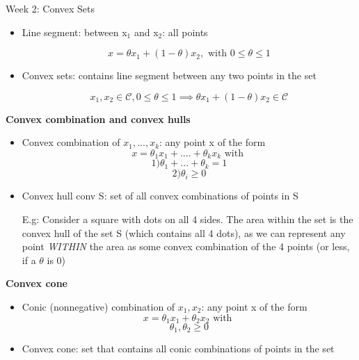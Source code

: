 \documentclass{article}
\begin{document}
\begin{homeworkProblemName}{{\LARGE Week 2: Convex Sets}}
\begin{problemAnswer}
{      \begin{itemize}
      \item  Line segment: between x$_1$ and x$_2$: all points

        \[x = \theta x_1 + (1 - \theta) x_2, \text{ with } 0 \leq \theta \leq 1\]

      \item Convex sets: contains line segment between any two points in the
        set

        \[x_1, x_2 \in \mathcal{C}, 0 \leq \theta \le 1 \implies \theta x_1 + (1 - \theta)x_2 \in \mathcal{C}\]
      \end{itemize}
    }\end{problemAnswer}

  \vspace{0.2 cm} \textbf{\large Convex combination and convex hulls}

  \begin{problemAnswer}{

      \begin{itemize}
        \item Convex combination of $x_1, ... , x_k$: any point x of the form
          \[x = \theta_1x_1 + .... + \theta_kx_k \text{ with }\]
            \[1) \theta_1 + ... + \theta_k = 1\]
            \[2) \theta_i \geq 0\]
        \item Convex hull conv S: set of all convex combinations of points in S

          E.g: Consider a square with dots on all 4 sides. The area within the
          set is the convex hull of the set S (which contains all 4 dots), as we
          can represent any point \textit{WITHIN} the area as some convex combination of the 4 points (or less, if a $\theta$ is 0)
      \end{itemize}
    }\end{problemAnswer}

  \clearpage

  \vspace{0.2 cm} \textbf{\large Convex cone}

  \begin{problemAnswer}{

      \begin{itemize}
        \item Conic (nonnegative) combination of $x_1, x_2$: any point x of the form
          \[x = \theta_1x_1 + \theta_2x_2 \text{ with }\]
          \[\theta_1, \theta_2 \geq 0\]
        \item Convex cone: set that contains all conic combinations of points in
          the set


\end{itemize}}
\end{problemAnswer}
\end{homeworkProblemName}
\end{document}
